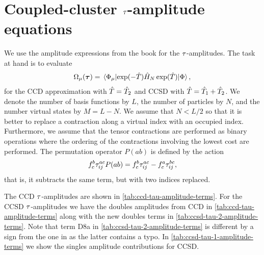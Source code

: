     \section{Coupled-cluster $\tau$-amplitude equations}
        \label{app:cc-tau-amplitudes}
        We use the amplitude expressions from the book
         \cite{shavitt2009many} for the
        $\tau$-amplitudes.
        The task at hand is to evaluate
        \begin{align}
            \Omega_{\mu}(\vfg{\clustamp})
            = \mel*{\slat_{\mu}}{
                \exponential(-\clust)
                \hamil_N
                \exponential(\clust)
            }{\slat},
        \end{align}
        for the CCD approximation with $\hat{T} = \hat{T}_2$ and CCSD with $\hat{T}
        = \hat{T}_1 + \hat{T}_2$.
        We denote the number of basis functions by $L$, the number of particles
        by $N$, and the number virtual states by $M = L - N$.
        We assume that $N < L / 2$ so that it is better to replace a contraction
        along a virtual index with an occupied index.
        Furthermore, we assume that the tensor contractions are performed as
        binary operations where the ordering of the contractions involving the
        lowest cost are performed.
        The permutation operator $P(ab)$ is defined by the action
        \begin{align}
            f^{b}_{c} \tau^{ac}_{ij} P(ab)
            =
            f^{b}_{c} \tau^{ac}_{ij}
            -
            f^{a}_{c} \tau^{bc}_{ij},
        \end{align}
        that is, it subtracts the same term, but with two indices replaced.

        The CCD $\tau$-amplitudes are shown in
        \autoref{tab:ccd-tau-amplitude-terms}.
        For the CCSD $\tau$-amplitudes we have the doubles amplitudes from
        CCD in \autoref{tab:ccd-tau-amplitude-terms} along with the new doubles
        terms in \autoref{tab:ccsd-tau-2-amplitude-terms}.
        Note that term D8a in \autoref{tab:ccsd-tau-2-amplitude-terms} is
        different by a sign from the one in  as the
        latter contains a typo.
        In \autoref{tab:ccsd-tau-1-amplitude-terms} we show the singles
        amplitude contributions for CCSD.

